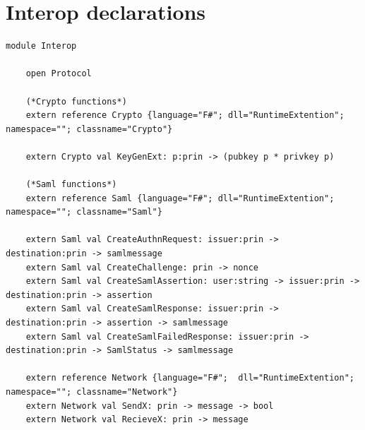 \documentclass[twosided]{report}
\begin{document}
\section{Interop declarations}
\begin{lstlisting}[style=fstar, caption={[Example of how to interop with .NET]Example of how to interop with .NET \cite{jacob}.}]
	module Interop

	open Protocol
	
	(*Crypto functions*)
	extern reference Crypto {language="F#"; dll="RuntimeExtention"; namespace=""; classname="Crypto"}
	
	extern Crypto val KeyGenExt: p:prin -> (pubkey p * privkey p)
	
	(*Saml functions*)
	extern reference Saml {language="F#"; dll="RuntimeExtention"; namespace=""; classname="Saml"}
	
	extern Saml val CreateAuthnRequest: issuer:prin -> destination:prin -> samlmessage
	extern Saml val CreateChallenge: prin -> nonce
	extern Saml val CreateSamlAssertion: user:string -> issuer:prin -> destination:prin -> assertion
	extern Saml val CreateSamlResponse: issuer:prin -> destination:prin -> assertion -> samlmessage
	extern Saml val CreateSamlFailedResponse: issuer:prin -> destination:prin -> SamlStatus -> samlmessage
	
	extern reference Network {language="F#";  dll="RuntimeExtention"; namespace=""; classname="Network"}
	extern Network val SendX: prin -> message -> bool
	extern Network val RecieveX: prin -> message
\end{lstlisting}
\clearpage
\end{document}
